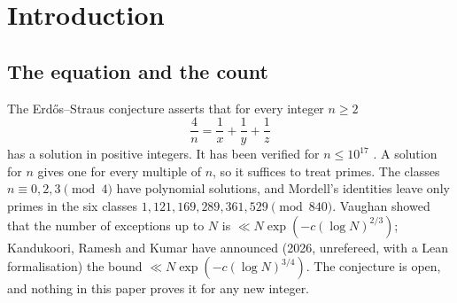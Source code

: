 \documentclass[11pt,reqno]{amsart}
\theoremstyle{definition}
\begin{document}
\section{Introduction}\label{sec:intro}

\subsection{The equation and the count}
The Erd\H{o}s--Straus conjecture asserts that for every integer $n\ge2$
\begin{equation}\label{eq:ES}
 \frac4n=\frac1x+\frac1y+\frac1z
\end{equation}
has a solution in positive integers.  It has been verified for
$n\le10^{17}$ \cite{Salez}.  A solution for $n$ gives one for every
multiple of $n$, so it suffices to treat primes.  The classes
$n\equiv 0,2,3\pmod 4$ have polynomial solutions, and Mordell's
identities \cite{Mordell} leave only primes in the six classes
$1,121,169,289,361,529\pmod{840}$.  Vaughan \cite{Vaughan} showed that
the number of exceptions up to $N$ is $\ll N\exp(-c(\log N)^{2/3})$;
Kandukoori, Ramesh and Kumar \cite{KRK} have announced (2026, unrefereed,
with a Lean formalisation) the bound $\ll N\exp(-c(\log N)^{3/4})$.
The conjecture is open, and nothing in this paper proves it for any new
integer.
\end{document}
